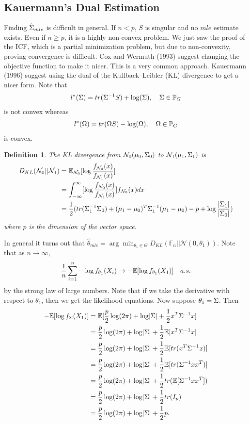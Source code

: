 \documentclass[12pt, leqno]{article}
\providecommand{\abs}[1]{\lvert#1\rvert}
\let\oldhat\hat
\renewcommand{\hat}[1]{\oldhat{{#1}}}
\def\s{\ensuremath\Sigma}
\def\om{\ensuremath\Omega}
\def\pg{\ensuremath\mathbb{P}_{{G}}}
\def\E{\ensuremath\mathbb{E}}
\newtheorem{defn}[thm]{Definition}
\begin{document}
\subsection{Kauermann's Dual Estimation}
Finding $\hat{\s}_{mle}$ is difficult in general. If $n<p$, $S$ is
singular and no $mle$ estimate exists. Even if $n \geq p$,  it is a
highly non-convex problem. We just saw the proof of the ICF, which is
a partial minimization problem, but due to non-convexity, proving
convergence is difficult. Cox and Wermuth (1993) suggest changing the
objective function to make it nicer. This is a very common
approach. Kauermann (1996) suggest using the dual of the
Kullback–Leibler (KL) divergence to get a nicer form. Note that 
\[
l^*(\s) = tr(\s^{-1}S) + \log(\s), \quad \s \in \pg
\]
is not convex whereas 
\[
l^*(\om) = tr(\om S) - \log(\om),  \quad \om \in \pg
\]
is convex. 
\begin{defn}
\label{defn:KLdivergence}
The KL divergence from $\mathcal{N}_0(\mu_0,\s_0)$ to
$\mathcal{N}_1(\mu_1,\s_1)$ is
\begin{align*}
D_{KL}(\mathcal{N}_0||\mathcal{N}_1) &= \E_{\mathcal{N}_0}
  [ \log \frac{{f_{\mathcal{N}_0}(x)}}{{f_{\mathcal{N}_1}(x)}}]\\
&= \int_{-\infty}^{\infty}  [\log
  \frac{{f_{\mathcal{N}_0}(x)}}{{f_{\mathcal{N}_1}(x)}}]
  {{f_{\mathcal{N}_0}(x)}} dx \\
&= \frac{1}{2}(tr(\s_1^{-1}
\s_0)+(\mu_1-\mu_0)^T\s_1^{-1}(\mu_1-\mu_0) - p + \log \frac{\abs{\s_1}}{\abs{\s_0}})
\end{align*}
where $p$ is the dimension of the vector space. 
\end{defn}
In general it turns out that $\hat{\theta}_{mle} = \arg\min_{\theta_1
  \in \Theta} D_{KL}(\mathbb{F}_n||\mathcal{N}(0,\theta_1))$. Note that
as $n \to \infty$, 
\begin{align*}
\frac{1}{n}\sum_{i=1}^n - \log{{f_{\theta_1}(X_i)}} \to -\E[\log{{f_{\theta_1}(X_1)}}] \quad
  a.s.
\end{align*}
by the strong law of large numbers.  Note that if we take the
derivative with respect to $\theta_1$, then we get the likelihood
equations. Now suppose $\theta_1 = \s$. Then 
\begin{align*}
-\E[\log{{f_{\s}(X_1)}}] &= \E[\frac{p}{2} \log (2 \pi) +
  \log \abs{\s} + \frac{1}{2}x^T\s^{-1}x]\\
&= \frac{p}{2} \log (2 \pi) +
  \log \abs{\s} + \frac{1}{2}\E[x^T\s^{-1}x] \\
&= \frac{p}{2} \log (2 \pi) +
  \log \abs{\s} + \frac{1}{2}\E[tr(x^T\s^{-1}x)] \\
&= \frac{p}{2} \log (2 \pi) +
  \log \abs{\s} + \frac{1}{2}\E[tr(\s^{-1}xx^T)] \\
&= \frac{p}{2} \log (2 \pi) +
  \log \abs{\s} + \frac{1}{2}tr(\E[\s^{-1}xx^T]) \\
&= \frac{p}{2} \log (2 \pi) +
  \log \abs{\s} + \frac{1}{2}tr(I_p) \\
&= \frac{p}{2} \log (2 \pi) +
  \log \abs{\s} + \frac{1}{2}p.
\end{align*}
\end{document}
